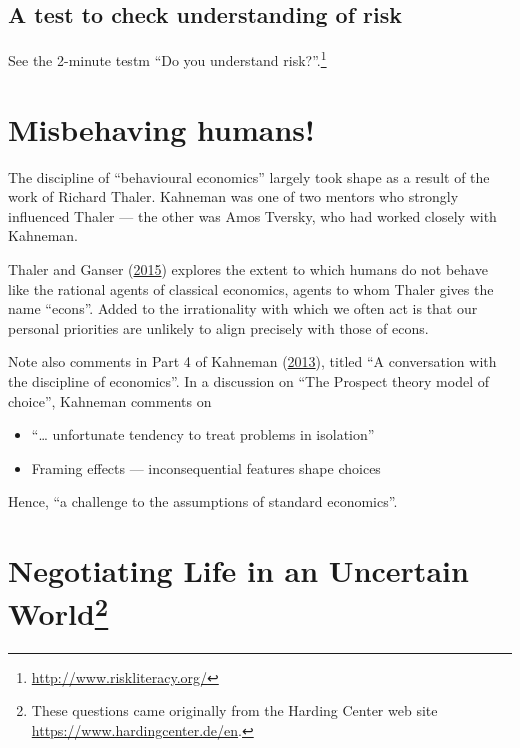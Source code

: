 \documentclass[
  10ptls,
  b5paper]{book}
\providecommand{\tightlist}{%
  \setlength{\itemsep}{0pt}\setlength{\parskip}{0pt}}
\begin{document}
\hypertarget{a-test-to-check-understanding-of-risk}{%
\subsection*{A test to check understanding of risk}\label{a-test-to-check-understanding-of-risk}}

See the 2-minute testm ``Do you understand risk?''.\footnote{\url{http://www.riskliteracy.org/}}

\hypertarget{misbehaving-humans}{%
\section{Misbehaving humans!}\label{misbehaving-humans}}

The discipline of ``behavioural economics'' largely took shape as a result of the work of Richard Thaler. Kahneman was one of two mentors who strongly influenced Thaler --- the other was Amos Tversky, who had worked closely with Kahneman.

Thaler and Ganser (\protect\hyperlink{ref-thaler2015misbehaving}{2015}) explores the extent to which humans do not behave like the rational agents of classical economics, agents to whom Thaler gives the name ``econs''. Added to the irrationality with which we often act is that our personal priorities are unlikely to align precisely with those of econs.

Note also comments in Part 4 of Kahneman (\protect\hyperlink{ref-kahneman_2013}{2013}), titled ``A conversation with the discipline of economics''. In a discussion on ``The Prospect theory model of choice'', Kahneman comments on

\begin{itemize}
\tightlist
\item
  ``\ldots{} unfortunate tendency to treat problems in isolation''
\item
  Framing effects --- inconsequential features shape choices
\end{itemize}

Hence, ``a challenge to the assumptions of standard economics''.

\hypertarget{negotiating-life-in-an-uncertain-world01-judgment-5}{%
\section[Negotiating Life in an Uncertain World]{\texorpdfstring{Negotiating Life in an Uncertain World\footnote{These questions came originally from the Harding Center web site \url{https://www.hardingcenter.de/en}.}}{Negotiating Life in an Uncertain World}}\label{negotiating-life-in-an-uncertain-world01-judgment-5}}
\end{document}

